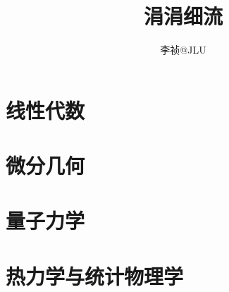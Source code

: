 \documentclass[thmcnt=section,lang=cn,20pt,scheme=chinese]{elegantbook}
\title{涓涓细流}
\author{李祯@JLU}
\date{\zhtoday}
\begin{document}
\maketitle

\frontmatter
\tableofcontents

\mainmatter

\part{线性代数}


\part{微分几何}



\part{量子力学}


\part{热力学与统计物理学}

\end{document}
